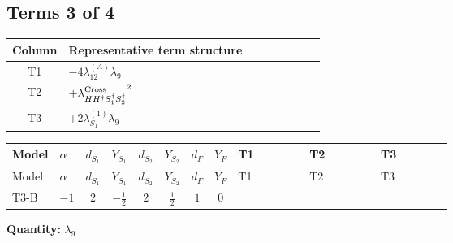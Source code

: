 \documentclass[8pt]{article}
\begin{document}
\begin{landscape}
\subsection*{Terms 3 of 4}
\begin{center}
\begin{tabular}{@{}c >{\raggedright\arraybackslash}p{0.82\linewidth}@{}}
\toprule
Column & Representative term structure \\
\midrule
T1 & \(\displaystyle -4 {\lambda_{12}^{(A)}} {\lambda_{9}}\) \\
\midrule
T2 & \(\displaystyle +{\lambda_{H H^\dagger S_1^\dagger S_2^\dagger}^{\rm Cross}}^2\) \\
\midrule
T3 & \(\displaystyle +2 {\lambda_{S_1}^{(1)}} {\lambda_{9}}\) \\
\midrule
\bottomrule
\end{tabular}
\end{center}
\smallskip
\tiny
\begin{longtable}{@{}llcccccc >{\raggedright\arraybackslash}p{0.21\linewidth} >{\raggedright\arraybackslash}p{0.21\linewidth} >{\raggedright\arraybackslash}p{0.21\linewidth}@{}}
\toprule
Model & $\alpha$ & $d_{S_1}$ & $Y_{S_1}$ & $d_{S_2}$ & $Y_{S_2}$ & $d_F$ & $Y_F$ & T1 & T2 & T3 \\
\midrule
\endfirsthead
\toprule
Model & $\alpha$ & $d_{S_1}$ & $Y_{S_1}$ & $d_{S_2}$ & $Y_{S_2}$ & $d_F$ & $Y_F$ & T1 & T2 & T3 \\
\midrule
\endhead
T3-B & $-1$ & $2$ & $-\frac{1}{2}$ & $2$ & $\frac{1}{2}$ & $1$ & $0$ & \scriptsize\adjustbox{max width=\linewidth}{$\begin{gathered} -4 {\lambda_{12}^{(A)}} {\lambda_{9}}\end{gathered}$} & \scriptsize\adjustbox{max width=\linewidth}{$\begin{gathered} +{\lambda_{H H^\dagger S_1^\dagger S_2^\dagger}^{\rm Cross}}^2\end{gathered}$} & \scriptsize\adjustbox{max width=\linewidth}{$\begin{gathered} +2 {\lambda_{S_1}^{(1)}} {\lambda_{9}}\end{gathered}$} \\
\midrule
\bottomrule
\end{longtable}
\clearpage
\noindent\textbf{Quantity: }$\lambda_{9}$\par\smallskip

\end{landscape}
\end{document}
